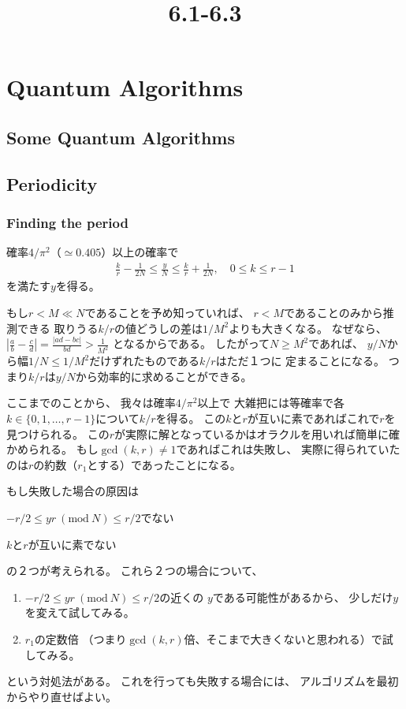 \documentclass[a4paper, 10pt]{jsarticle}
\title{6.1-6.3}
\author{}
\begin{document}
\maketitle

\setcounter{section}{5}
\section{Quantum Algorithms}
\subsection{Some Quantum Algorithms}

\subsection{Periodicity}
\subsubsection{Finding the period}
確率$4/\pi^2$（$\simeq 0.405$）以上の確率で
\begin{align}
	\frac{k}{r} - \frac{1}{2N} \leq \frac{y}{N} \leq \frac{k}{r}
	+ \frac{1}{2N},
	\quad 0 \leq k \leq r-1
	\label{yの条件}
\end{align}
を満たす$y$を得る。

もし$r< M \ll N$であることを予め知っていれば、
$r < M$であることのみから推測できる
取りうる$k/r$の値どうしの差は$1/M^2$よりも大きくなる。
なぜなら、
$\left| \frac{a}{b} - \frac{c}{d} \right|
= \frac{|ad - bc|}{bd} > \frac{1}{M^2}$
となるからである。
したがって$N \geq M^2$であれば、
$y/N$から幅$1/N \leq 1/M^2$だけずれたものである$k/r$はただ１つに
定まることになる。
つまり$k/r$は$y/N$から効率的に求めることができる。

ここまでのことから、
我々は確率$4/\pi^2$以上で
大雑把には等確率で各$k \in \{0, 1, \dots, r-1\}$について$k/r$を得る。
この$k$と$r$が互いに素であればこれで$r$を見つけられる。
この$r$が実際に解となっているかはオラクルを用いれば簡単に確かめられる。
もし$\gcd (k, r) \neq 1$であればこれは失敗し、
実際に得られていたのは$r$の約数（$r_1$とする）であったことになる。

もし失敗した場合の原因は
\begin{enumerate*}
	\item $-r/2 \leq yr \ (\mathrm{mod} \ N) \leq r/2$でない
	\item $k$と$r$が互いに素でない
\end{enumerate*}
の２つが考えられる。
これら２つの場合について、
\begin{enumerate}
	\item \label{条件を満たさないyの場合}
	$-r/2 \leq yr \ (\mathrm{mod} \ N) \leq r/2$の近くの
	$y$である可能性があるから、
	少しだけ$y$を変えて試してみる。
	\item \label{互いに素でない場合}
	$r_1$の定数倍
	（つまり$\gcd (k, r)$倍、そこまで大きくないと思われる）で試してみる。
\end{enumerate}
という対処法がある。
これを行っても失敗する場合には、
アルゴリズムを最初からやり直せばよい。
\end{document}
